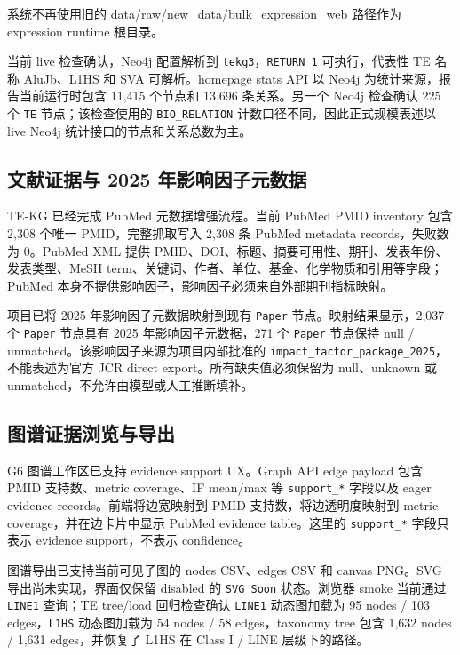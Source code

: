 \documentclass[12pt,a4paper,UTF8]{ctexart}
\begin{document}
系统不再使用旧的 \url{data/raw/new_data/bulk_expression_web} 路径作为 expression runtime 根目录。

当前 live 检查确认，Neo4j 配置解析到 \texttt{tekg3}，\texttt{RETURN 1} 可执行，代表性 TE 名称 AluJb、L1HS 和 SVA 可解析。homepage stats API 以 Neo4j 为统计来源，报告当前运行时包含 11,415 个节点和 13,696 条关系。另一个 Neo4j 检查确认 225 个 \texttt{TE} 节点；该检查使用的 \texttt{BIO\_RELATION} 计数口径不同，因此正式规模表述以 live Neo4j 统计接口的节点和关系总数为主。

\subsection{文献证据与 2025 年影响因子元数据}

TE-KG 已经完成 PubMed 元数据增强流程。当前 PubMed PMID inventory 包含 2,308 个唯一 PMID，完整抓取写入 2,308 条 PubMed metadata records，失败数为 0。PubMed XML 提供 PMID、DOI、标题、摘要可用性、期刊、发表年份、发表类型、MeSH term、关键词、作者、单位、基金、化学物质和引用等字段；PubMed 本身不提供影响因子，影响因子必须来自外部期刊指标映射\cite{pubmed_ncbi}。

项目已将 2025 年影响因子元数据映射到现有 \texttt{Paper} 节点。映射结果显示，2,037 个 \texttt{Paper} 节点具有 2025 年影响因子元数据，271 个 \texttt{Paper} 节点保持 null / unmatched。该影响因子来源为项目内部批准的 \texttt{impact\_factor\_package\_2025}，不能表述为官方 JCR direct export。所有缺失值必须保留为 null、unknown 或 unmatched，不允许由模型或人工推断填补。

\subsection{图谱证据浏览与导出}

G6 图谱工作区已支持 evidence support UX。Graph API edge payload 包含 PMID 支持数、metric coverage、IF mean/max 等 \texttt{support\_*} 字段以及 eager evidence records。前端将边宽映射到 PMID 支持数，将边透明度映射到 metric coverage，并在边卡片中显示 PubMed evidence table。这里的 \texttt{support\_*} 字段只表示 evidence support，不表示 confidence。

图谱导出已支持当前可见子图的 nodes CSV、edges CSV 和 canvas PNG。SVG 导出尚未实现，界面仅保留 disabled 的 \texttt{SVG Soon} 状态。浏览器 smoke 当前通过 \texttt{LINE1} 查询；TE tree/load 回归检查确认 \texttt{LINE1} 动态图加载为 95 nodes / 103 edges，\texttt{L1HS} 动态图加载为 54 nodes / 58 edges，taxonomy tree 包含 1,632 nodes / 1,631 edges，并恢复了 L1HS 在 Class I / LINE 层级下的路径。
\end{document}

